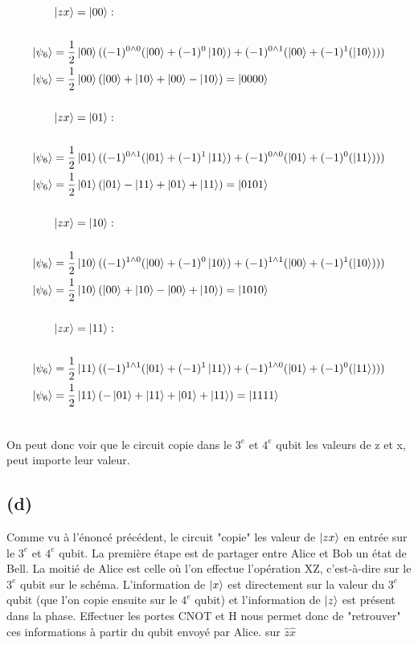 \documentclass{article}
\begin{document}
\begin{align*}
    &\ket{zx} = \ket{00} : \\ \\
    \ket{\psi_6} &= \frac{1}{2}\ket{00}((-1)^{0 \wedge 0}(\ket{00} + (-1)^0 \ket{10}) + (-1)^{0 \wedge 1}(\ket{00} + (-1)^1(\ket{10}))) \\
    \ket{\psi_6} &= \frac{1}{2}\ket{00}(\ket{00} + \ket{10} + \ket{00} - \ket{10}) = \ket{0000} \\ \\
    &\ket{zx} = \ket{01} : \\ \\
    \ket{\psi_6} &= \frac{1}{2}\ket{01}((-1)^{0 \wedge 1}(\ket{01} + (-1)^1 \ket{11}) + (-1)^{0 \wedge 0}(\ket{01} + (-1)^0(\ket{11}))) \\
    \ket{\psi_6} &= \frac{1}{2}\ket{01}(\ket{01} - \ket{11} + \ket{01} + \ket{11}) = \ket{0101} \\ \\
    &\ket{zx} = \ket{10} : \\ \\
    \ket{\psi_6} &= \frac{1}{2}\ket{10}((-1)^{1 \wedge 0}(\ket{00} + (-1)^0 \ket{10}) + (-1)^{1 \wedge 1}(\ket{00} + (-1)^1(\ket{10}))) \\
    \ket{\psi_6} &= \frac{1}{2}\ket{10}(\ket{00} + \ket{10} - \ket{00} + \ket{10}) = \ket{1010} \\ \\
    &\ket{zx} = \ket{11} : \\ \\
    \ket{\psi_6} &= \frac{1}{2}\ket{11}((-1)^{1 \wedge 1}(\ket{01} + (-1)^1 \ket{11}) + (-1)^{1 \wedge 0}(\ket{01} + (-1)^0(\ket{11}))) \\
    \ket{\psi_6} &= \frac{1}{2}\ket{11}(-\ket{01} + \ket{11} + \ket{01} + \ket{11}) = \ket{1111} \\ \\
\end{align*}
\begin{flushleft}
    On peut donc voir que le circuit copie dans le $3^e$ et $4^e$ qubit les valeurs de z et x, peut importe leur valeur.
\end{flushleft}
\newpage
\subsection*{(d)}
\begin{flushleft}
    Comme vu à l'énoncé précédent, le circuit "copie" les valeur de $\ket{zx}$ en entrée sur le $3^e$ et $4^e$ qubit.
    La première étape est de partager entre Alice et Bob un état de Bell. La moitié de Alice est celle où l'on effectue
    l'opération XZ, c'est-à-dire sur le $3^e$ qubit sur le schéma. L'information de $\ket{x}$ est directement sur la valeur du $3^e$
    qubit (que l'on copie ensuite sur le $4^e$ qubit) et l'information de $\ket{z}$ est présent dans la phase. Effectuer les portes
    CNOT et H nous permet donc de "retrouver" ces informations à partir du qubit envoyé par Alice.
    sur $\hat{z}\hat{x}$
\end{flushleft}
\end{document}
